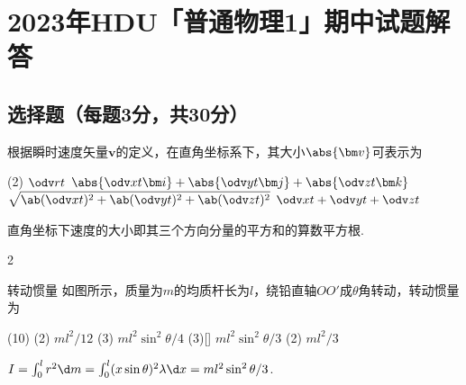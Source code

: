 \chapter{2023年\textsf{HDU}「普通物理1」期中试题解答}



\section{选择题（每题3分，共30分）}

\begin{problem}
    根据瞬时速度矢量$\bm v$的定义，在直角坐标系下，其大小$\abs{\bm v}$可表示为
    \begin{tasks}(2)
        \task $\displaystyle\odv rt$
        \task $\displaystyle\abs{\odv xt\bm i}+\abs{\odv yt\bm j}+\abs{\odv zt\bm k}$
        \task[\true] $\displaystyle\sqrt{\ab(\odv xt)^2+\ab(\odv yt)^2+\ab(\odv zt)^2}$
        \task $\displaystyle\odv xt+\odv yt+\odv zt$
    \end{tasks}
\end{problem}
\begin{solution}
    直角坐标下速度的大小即其三个方向分量的平方和的算数平方根.
\end{solution}

\begin{paracol}{2}
\begin{problem}{转动惯量}
    如图所示，质量为$m$的均质杆长为$l$，绕铅直轴$OO'$成$\theta$角转动，转动惯量为
    \begin{tasks}(10)
        \task*(2) $ml^2/12$
        \task*(3) $ml^2\sin^2\theta/4$
        \task*(3)[\true] $ml^2\sin^2{\theta}/3$
        \task*(2) $ml^2/3$
    \end{tasks}
\end{problem}
\switchcolumn
\centering
{}
\switchcolumn
\begin{solution}
    $I=\int_0^lr^2\d m=\int_0^l(x\sin\theta)^2\lambda\d x=ml^2\sin^2\theta/3$.
\end{solution}
\end{paracol}

